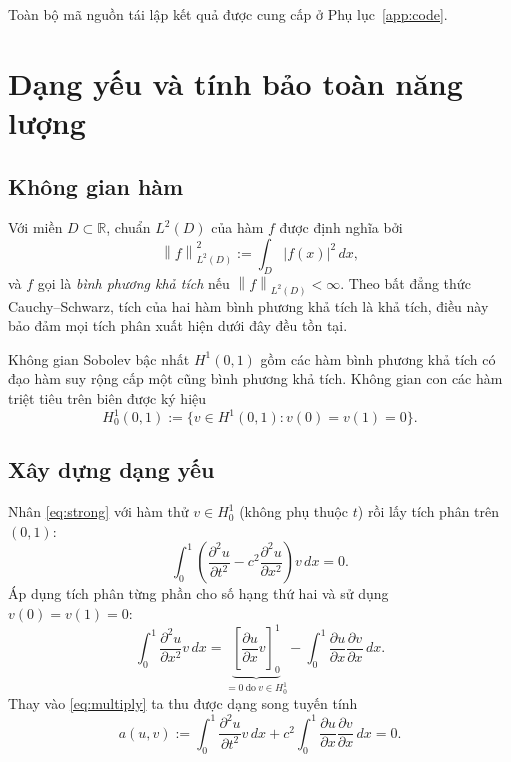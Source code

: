 \documentclass[11pt,a4paper]{article}
\theoremstyle{plain}
\theoremstyle{definition}
\theoremstyle{remark}
\newcommand{\R}{\mathbb{R}}
\newcommand{\Hone}{H^{1}}
\newcommand{\Hzero}{H^{1}_{0}}
\newcommand{\Ltwo}{L^{2}}
\newcommand{\norm}[1]{\left\lVert #1 \right\rVert}
\begin{document}
Toàn bộ mã nguồn tái lập kết quả được cung cấp ở Phụ lục~\ref{app:code}.

\section{Dạng yếu và tính bảo toàn năng lượng}
\label{sec:dangyeu}

\subsection{Không gian hàm}

Với miền $D \subset \R$, chuẩn $\Ltwo(D)$ của hàm $f$ được định nghĩa bởi
\begin{equation}
\label{eq:l2norm}
  \norm{f}_{\Ltwo(D)}^{2} := \int_{D} \lvert f(x) \rvert^{2}\,dx ,
\end{equation}
và $f$ gọi là \emph{bình phương khả tích} nếu
$\norm{f}_{\Ltwo(D)} < \infty$. Theo bất đẳng thức Cauchy--Schwarz, tích của
hai hàm bình phương khả tích là khả tích, điều này bảo đảm mọi tích phân
xuất hiện dưới đây đều tồn tại.

Không gian Sobolev bậc nhất $\Hone(0,1)$ gồm các hàm bình phương khả tích có
đạo hàm suy rộng cấp một cũng bình phương khả tích. Không gian con các hàm
triệt tiêu trên biên được ký hiệu
\[
  \Hzero(0,1) := \bigl\{ v \in \Hone(0,1) : v(0) = v(1) = 0 \bigr\}.
\]

\subsection{Xây dựng dạng yếu}

Nhân \eqref{eq:strong} với hàm thử $v \in \Hzero$ (không phụ thuộc $t$) rồi
lấy tích phân trên $(0,1)$:
\begin{equation}
\label{eq:multiply}
  \int_{0}^{1}
    \left( \frac{\partial^{2}u}{\partial t^{2}}
         - c^{2}\frac{\partial^{2}u}{\partial x^{2}} \right) v \,dx = 0 .
\end{equation}
Áp dụng tích phân từng phần cho số hạng thứ hai và sử dụng $v(0)=v(1)=0$:
\begin{equation}
\label{eq:byparts}
  \int_{0}^{1} \frac{\partial^{2}u}{\partial x^{2}} v \,dx
  = \underbrace{\left[ \frac{\partial u}{\partial x} v \right]_{0}^{1}}
    _{\textstyle = 0 \ \text{do}\ v \in \Hzero}
    - \int_{0}^{1} \frac{\partial u}{\partial x}
                   \frac{\partial v}{\partial x} \,dx .
\end{equation}
Thay vào \eqref{eq:multiply} ta thu được dạng song tuyến tính
\begin{equation}
\label{eq:bilinear}
  a(u,v) := \int_{0}^{1} \frac{\partial^{2}u}{\partial t^{2}} v \,dx
          + c^{2}\int_{0}^{1} \frac{\partial u}{\partial x}
                              \frac{\partial v}{\partial x} \,dx = 0 .
\end{equation}
\end{document}
